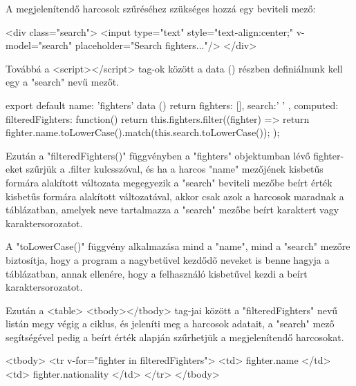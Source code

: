 A megjelenítendő harcosok szűréséhez szükséges hozzá egy beviteli mező:

\begin{cpp}
<div class="search">
	<input type="text" style="text-align:center;" v-model="search" 
	placeholder="Search fighters..."/>
</div>
\end{cpp}

Továbbá a <script></script> tag-ok között a data () részben definiálnunk kell egy a "search" nevű mezőt.

\begin{cpp}
export default {
  name: 'fighters'
   data () {
    return {
      fighters: [],
      search:' '  }},
computed: {
    	filteredFighters: function(){
    		return this.fighters.filter((fighter) => {
return fighter.name.toLowerCase().match(this.search.toLowerCase());
    		});}}
}
\end{cpp}

Ezután a "filteredFighters()" függvényben a "fighters" objektumban lévő fighter-eket szűrjük a .filter kulcsszóval, és ha a harcos "name" mezőjének kisbetűs formára alakított változata megegyezik a "search" beviteli mezőbe beírt érték kisbetűs formára alakított változatával, akkor csak azok a harcosok maradnak a táblázatban, amelyek neve tartalmazza a "search" mezőbe beírt karaktert vagy karaktersorozatot.

A "toLowerCase()" függvény alkalmazása mind a "name", mind a "search" mezőre biztosítja, hogy a program a nagybetűvel kezdődő neveket is benne hagyja a táblázatban, annak ellenére, hogy a felhasználó kisbetűvel kezdi a beírt karaktersorozatot.

Ezután a <table> <tbody></tbody> tag-jai között a "filteredFighters" nevű listán megy végig a ciklus, és jeleníti meg a harcosok adatait, a "search" mező segítségével pedig a beírt érték alapján szűrhetjük a megjelenítendő harcosokat.

\begin{cpp}
<tbody>
	<tr v-for="fighter in filteredFighters">
    	<td>{{ fighter.name }}</td>
          <td>{{ fighter.nationality }}</td>
        </tr>
</tbody>
\end{cpp}
\newpage
{}

